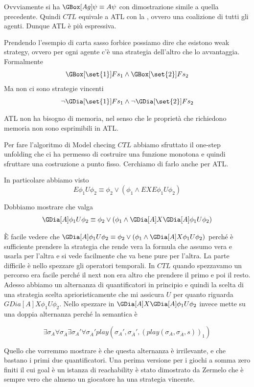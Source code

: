 Ovvviamente si ha \(\GBox[Ag] \psi \equiv A\psi\) con dimostrazione simile a quella precedente. Quindi \(CTL\) equivale a ATL con la , ovvero una coalizione di tutti gli agenti. Dunque ATL è più espressiva.

Prendendo l'esempio di carta sasso forbice possiamo dire che esistono weak strategy, ovvero per ogni agente c'è una strategia dell'altro che lo avvantaggia. Formalmente
\[\GBox[\set{1}] F s_1\land \GBox[\set{2}] F s_2\]
Ma non ci sono strategie vincenti
\[\neg \GDia[\set{1}] F s_1 \land \neg \GDia[\set{2}] F s_2\]

ATL non ha bisogno di memoria, nel senso che le proprietà che richiedono memoria non sono esprimibili in ATL.

Per fare l'algoritmo di Model checing \(CTL\) abbiamo sfruttato il one-step unfolding che ci ha permesso di costruire una funzione monotona e quindi sfruttare una costruzione a punto fisso. Cerchiamo di farlo anche per ATL.

In particolare abbiamo visto
\[E \phi_1 U\phi_2 \equiv \phi_2 \lor (\phi_1\land E X E \phi_1 U\phi_2)\]

Dobbiamo mostrare che valga
\[\GDia[A] \phi_1 U\phi_2 \equiv \phi_2 \lor (\phi_1\land \GDia[A] X \GDia[A] \phi_1 U\phi_2)\]

È facile vedere che \(\GDia[A] \phi_1 U\phi_2 \equiv \phi_2 \lor (\phi_1\land \GDia[A] X \phi_1 U\phi_2)\) perché è sufficiente prendere la strategia che rende vera la formula che assumo vera e usarla per l'altra e si vede facilmente che va bene pure per l'altra. La parte difficile è nello spezzare gli operatori temporali. In \(CTL\) quando spezzavamo un percorso era facile perché il next non era altro che prendere il primo e poi il resto. Adesso abbiamo un alternanza di quantificatori in principio e quindi la scelta di una strategia scelta aprioristicamente che mi assicura \(U\) per quanto riguarda \(GDia[A] X \phi_1 U\phi_2\). Nello spezzare in \(\GDia[A] X \GDia[A] \phi_1 U\phi_2\) invece mette su una doppia alternanza perché la semantica è

\[\exists \sigma_A \forall \sigma_{\overline{A}} \exists \sigma_{A}' \forall \sigma_{\overline{A}}' play(\sigma_{A}',\sigma_{\overline{A}}',{\left(play(\sigma_A,\sigma_{\overline{A}},s)\right)}_1) \]

Quello che vorremmo mostrare è che questa alternanza è irrilevante, e che bastano i primi due quantificatori. Una perima versione per i giochi a somma zero finiti il cui goal è un istanza di reachability è stato dimostrato da Zermelo che è sempre vero che almeno un giocatore ha una strategia vincente.

